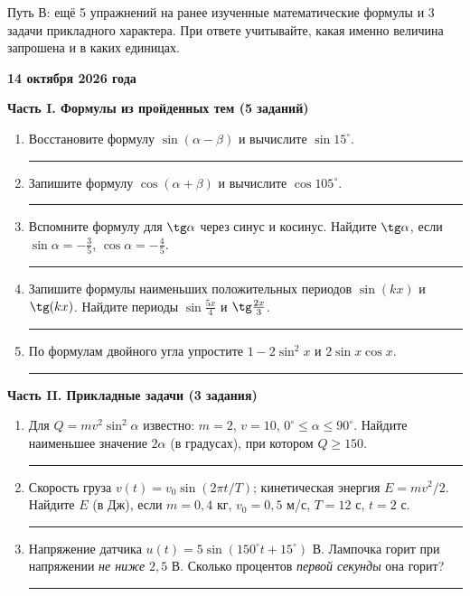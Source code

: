 \documentclass[a4paper,12pt]{article}
\newcommand{\sectiontitle}[1]{\vspace{4pt}{\Large\bfseries\color{darkaccent} #1}\par\vspace{1pt}{\color{accent}\rule{\linewidth}{0.55pt}}\vspace{3pt}}
\newcommand{\subsectiontitle}[1]{{\large\bfseries\color{darkaccent}#1}\par}
\newcommand{\degc}{^{\circ}}
\newcommand{\answerline}{\hfill\rule{23mm}{0.35pt}}
\begin{document}
\clearpage
\sectiontitle{07. Путь В · второй день}
{\color{muted}\small Путь В: ещё 5 упражнений на ранее изученные математические формулы и 3 задачи прикладного характера. При ответе учитывайте, какая именно величина запрошена и в каких единицах.}\par
\vspace{4mm}
\subsectiontitle{14 октября 2026 года}
\vspace{2mm}
{\bfseries\color{accent} Часть I. Формулы из пройденных тем (5 заданий)}
\begin{enumerate}[label=\textbf{\color{accent}\arabic*.},start=9,itemsep=7pt]
\item Восстановите формулу $\sin(\alpha-\beta)$ и вычислите $\sin15\degc$. \answerline
\item Запишите формулу $\cos(\alpha+\beta)$ и вычислите $\cos105\degc$. \answerline
\item Вспомните формулу для $\tg\alpha$ через синус и косинус. Найдите $\tg\alpha$, если $\sin\alpha=-\frac35$, $\cos\alpha=-\frac45$. \answerline
\item Запишите формулы наименьших положительных периодов $\sin(kx)$ и $\tg(kx)$. Найдите периоды $\sin\frac{5x}{4}$ и $\tg\frac{2x}{3}$. \answerline
\item По формулам двойного угла упростите $1-2\sin^2x$ и $2\sin x\cos x$. \answerline
\end{enumerate}
\vspace{3mm}
{\bfseries\color{accent} Часть II. Прикладные задачи (3 задания)}
\begin{enumerate}[label=\textbf{\color{accent}\arabic*.},start=14,itemsep=10pt]
\item Для $Q=mv^2\sin^2\alpha$ известно: $m=2$, $v=10$, $0\degc\le\alpha\le90\degc$. Найдите наименьшее значение $2\alpha$ (в градусах), при котором $Q\ge150$. \answerline
\item Скорость груза $v(t)=v_0\sin(2\pi t/T)$; кинетическая энергия $E=mv^2/2$. Найдите $E$ (в Дж), если $m=0{,}4$ кг, $v_0=0{,}5$ м/с, $T=12$ с, $t=2$ с. \answerline
\item Напряжение датчика $u(t)=5\sin(150\degc t+15\degc)$ В. Лампочка горит при напряжении \emph{не ниже} $2{,}5$ В. Сколько процентов \emph{первой секунды} она горит? \answerline
\end{enumerate}
\end{document}
